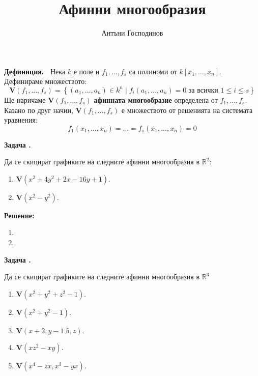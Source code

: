 \documentclass[a4paper,12pt,fleqn]{article}
\title{Афинни многообразия}
\author{Антъни Господинов}
\date{}
\newcounter{problem}
\newcommand\problem{%
  \stepcounter{problem}%
  \textbf{Задача \theproblem.}~%
}
\newcommand\solution{%
  \textbf{Решение:}~%
}
\begin{document}
    \maketitle
    \textbf{Дефиниция.~} Нека \( k \) е поле и \( f_{1},\dots,f_{s} \) са полиноми от \( k \left[ x_{1},\dots,x_{n} \right] \). Дефинираме множеството: 
    \begin{equation*}
        \mathbf{V}\left( f_{1},\dots,f_{s} \right)=\left\{ \left( a_{1},\dots,a_{n} \right) \in k^{n} \mid f_{i}(a_{1},\dots,a_{n})=0 \textit{ за всички } 1 \leq i \leq s \right\}
    \end{equation*}
    Ще наричаме \( \textbf{V}\left( f_{1},\dots,f_{s} \right) \) \textbf{афинната многообразие} определена от \( f_{1},\dots,f_{s} \). Казано по друг начин, \( \textbf{V}\left( f_{1},\dots,f_{s} \right) \) е множеството от решенията на системата уравнения: 
    \begin{equation*}
        f_{1}(x_{1},\dots,x_{n}) = \dots = f_{s}(x_{1},\dots,x_{n}) = 0
    \end{equation*} 

    \problem{Да се скицират графиките на следните афинни многообразия в \( \mathbb{R}^{2} \):
    \begin{enumerate}
        \item \( \mathbf{V}(x^{2}+4y^{2}+2x-16y+1) \).
        \item \( \mathbf{V}(x^{2}-y^{2}) \).
    \end{enumerate}
    }

    \solution{
        \begin{enumerate}
            \item 
                \begin{minipage}[t]{\linewidth}
                    \raggedright
                \end{minipage}
                \item 
                \begin{minipage}[t]{\linewidth}
                    \raggedright
                \end{minipage}
        \end{enumerate} 
    }

    \problem{Да се скицират графиките на следните афинни многообразия в \( \mathbb{R}^{3} \)
    \begin{enumerate}
        \item \( \mathbf{V}(x^{2}+y^{2}+z^{2}-1) \).
        \item \( \mathbf{V}(x^{2}+y^{2}-1) \).
        \item \( \mathbf{V}(x+2,y-1.5,z) \).
        \item \( \mathbf{V}(xz^{2}-xy) \).
        \item \( \mathbf{V}(x^{4}-zx,x^{3}-yx) \).
    \end{enumerate}}
\end{document}
